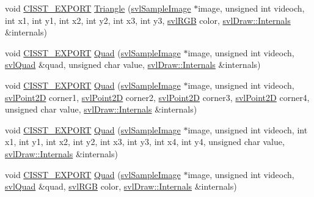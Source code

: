 \begin{DoxyCompactItemize}
\item 
void \hyperlink{cmn_export_macros_8h_a99393e0c3ac434b2605235bbe20684f8}{C\+I\+S\+S\+T\+\_\+\+E\+X\+P\+O\+R\+T} \hyperlink{namespacesvl_draw_a7f3d7efcd5dbc9404bcf3c8e7627f293}{Triangle} (\hyperlink{classsvl_sample_image}{svl\+Sample\+Image} $\ast$image, unsigned int videoch, int x1, int y1, int x2, int y2, int x3, int y3, \hyperlink{structsvl_r_g_b}{svl\+R\+G\+B} color, \hyperlink{classsvl_draw_1_1_internals}{svl\+Draw\+::\+Internals} \&internals)
\item 
void \hyperlink{cmn_export_macros_8h_a99393e0c3ac434b2605235bbe20684f8}{C\+I\+S\+S\+T\+\_\+\+E\+X\+P\+O\+R\+T} \hyperlink{namespacesvl_draw_a9556394a37e0440d5ad9a2c3da21976b}{Quad} (\hyperlink{classsvl_sample_image}{svl\+Sample\+Image} $\ast$image, unsigned int videoch, \hyperlink{structsvl_quad}{svl\+Quad} \&quad, unsigned char value, \hyperlink{classsvl_draw_1_1_internals}{svl\+Draw\+::\+Internals} \&internals)
\item 
void \hyperlink{cmn_export_macros_8h_a99393e0c3ac434b2605235bbe20684f8}{C\+I\+S\+S\+T\+\_\+\+E\+X\+P\+O\+R\+T} \hyperlink{namespacesvl_draw_a6885d9bb85c0fb7cf53f0491dcafc69c}{Quad} (\hyperlink{classsvl_sample_image}{svl\+Sample\+Image} $\ast$image, unsigned int videoch, \hyperlink{structsvl_point2_d}{svl\+Point2\+D} corner1, \hyperlink{structsvl_point2_d}{svl\+Point2\+D} corner2, \hyperlink{structsvl_point2_d}{svl\+Point2\+D} corner3, \hyperlink{structsvl_point2_d}{svl\+Point2\+D} corner4, unsigned char value, \hyperlink{classsvl_draw_1_1_internals}{svl\+Draw\+::\+Internals} \&internals)
\item 
void \hyperlink{cmn_export_macros_8h_a99393e0c3ac434b2605235bbe20684f8}{C\+I\+S\+S\+T\+\_\+\+E\+X\+P\+O\+R\+T} \hyperlink{namespacesvl_draw_a9f9496eeea8aa512916b7b7bab6ca77c}{Quad} (\hyperlink{classsvl_sample_image}{svl\+Sample\+Image} $\ast$image, unsigned int videoch, int x1, int y1, int x2, int y2, int x3, int y3, int x4, int y4, unsigned char value, \hyperlink{classsvl_draw_1_1_internals}{svl\+Draw\+::\+Internals} \&internals)
\item 
void \hyperlink{cmn_export_macros_8h_a99393e0c3ac434b2605235bbe20684f8}{C\+I\+S\+S\+T\+\_\+\+E\+X\+P\+O\+R\+T} \hyperlink{namespacesvl_draw_ac96400e07c14d0d1c4d9d1d106895c20}{Quad} (\hyperlink{classsvl_sample_image}{svl\+Sample\+Image} $\ast$image, unsigned int videoch, \hyperlink{structsvl_quad}{svl\+Quad} \&quad, \hyperlink{structsvl_r_g_b}{svl\+R\+G\+B} color, \hyperlink{classsvl_draw_1_1_internals}{svl\+Draw\+::\+Internals} \&internals)
\item 

\end{DoxyCompactItemize}
